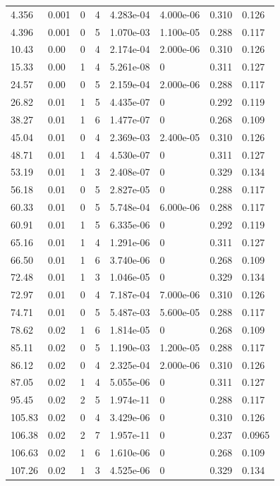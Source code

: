 \documentclass[preview]{standalone}
\begin{document}
{{\begin{tabular}{L{1.2cm}C{1.2cm} C{0.3cm}C{0.5cm} C{1.4cm}C{1.4cm} C{1.4cm}C{1.4cm}}
  4.356  &  0.001  & 0     &  4 &  4.283e-04  & 4.000e-06  & 0.310 &  0.126   \\ 
  4.396  &  0.001  & 0     &  5 &  1.070e-03  & 1.100e-05  & 0.288 &  0.117   \\ 
  10.43  &  0.00  & 0     &  4 &  2.174e-04  & 2.000e-06  & 0.310 &  0.126   \\ 
  15.33  &  0.00  & 1     &  4 &  5.261e-08  & 0  & 0.311 &  0.127   \\ 
  24.57  &  0.00  & 0     &  5 &  2.159e-04  & 2.000e-06  & 0.288 &  0.117   \\ 
  26.82  &  0.01  & 1     &  5 &  4.435e-07  & 0  & 0.292 &  0.119   \\ 
  38.27  &  0.01  & 1     &  6 &  1.477e-07  & 0  & 0.268 &  0.109   \\ 
  45.04  &  0.01  & 0     &  4 &  2.369e-03  & 2.400e-05  & 0.310 &  0.126   \\ 
  48.71  &  0.01  & 1     &  4 &  4.530e-07  & 0  & 0.311 &  0.127   \\ 
  53.19  &  0.01  & 1     &  3 &  2.408e-07  & 0  & 0.329 &  0.134   \\ 
  56.18  &  0.01  & 0     &  5 &  2.827e-05  & 0  & 0.288 &  0.117   \\ 
  60.33  &  0.01  & 0     &  5 &  5.748e-04  & 6.000e-06  & 0.288 &  0.117   \\ 
  60.91  &  0.01  & 1     &  5 &  6.335e-06  & 0  & 0.292 &  0.119   \\ 
  65.16  &  0.01  & 1     &  4 &  1.291e-06  & 0  & 0.311 &  0.127   \\ 
  66.50  &  0.01  & 1     &  6 &  3.740e-06  & 0  & 0.268 &  0.109   \\ 
  72.48  &  0.01  & 1     &  3 &  1.046e-05  & 0  & 0.329 &  0.134   \\ 
  72.97  &  0.01  & 0     &  4 &  7.187e-04  & 7.000e-06  & 0.310 &  0.126   \\ 
  74.71  &  0.01  & 0     &  5 &  5.487e-03  & 5.600e-05  & 0.288 &  0.117   \\ 
  78.62  &  0.02  & 1     &  6 &  1.814e-05  & 0  & 0.268 &  0.109   \\ 
  85.11  &  0.02  & 0     &  5 &  1.190e-03  & 1.200e-05  & 0.288 &  0.117   \\ 
  86.12  &  0.02  & 0     &  4 &  2.325e-04  & 2.000e-06  & 0.310 &  0.126   \\ 
  87.05  &  0.02  & 1     &  4 &  5.055e-06  & 0  & 0.311 &  0.127   \\ 
  95.45  &  0.02  & 2     &  5 &  1.974e-11  & 0  & 0.288 &  0.117   \\ 
  105.83  &  0.02  & 0     &  4 &  3.429e-06  & 0  & 0.310 &  0.126   \\ 
  106.38  &  0.02  & 2     &  7 &  1.957e-11  & 0  & 0.237 &  0.0965   \\ 
  106.63  &  0.02  & 1     &  6 &  1.610e-06  & 0  & 0.268 &  0.109   \\ 
  107.26  &  0.02  & 1     &  3 &  4.525e-06  & 0  & 0.329 &  0.134   \\ 
\hline 
\end{tabular} 

}}
\end{document}
